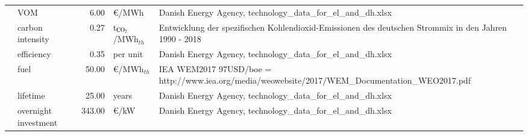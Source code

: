 \begin{longtable}{p{4cm}p{4cm}rp{3cm}p{10cm}}
                      & VOM &         6.00 &                     \euro/MWh &                                                                                                                                                                                                                                                                        Danish Energy Agency, technology\_data\_for\_el\_and\_dh.xlsx \\
                      & carbon intensity &         0.27 &     t$_{\ce{CO2}}$/MWh$_{th}$ &                                                                                                                                                                                                                                Entwicklung der spezifischen Kohlendioxid-Emissionen des deutschen Strommix in den Jahren 1990 - 2018 \\
                      & efficiency &         0.35 &                      per unit &                                                                                                                                                                                                                                                                        Danish Energy Agency, technology\_data\_for\_el\_and\_dh.xlsx \\
                      & fuel &        50.00 &              \euro/MWh$_{th}$ &                                                                                                                                                                                                                                     IEA WEM2017 97USD/boe = http://www.iea.org/media/weowebsite/2017/WEM\_Documentation\_WEO2017.pdf \\
                      & lifetime &        25.00 &                         years &                                                                                                                                                                                                                                                                        Danish Energy Agency, technology\_data\_for\_el\_and\_dh.xlsx \\
                      & overnight investment &       343.00 &                      \euro/kW &                                                                                                                                                                                                                                                                        Danish Energy Agency, technology\_data\_for\_el\_and\_dh.xlsx \\

\end{longtable}
